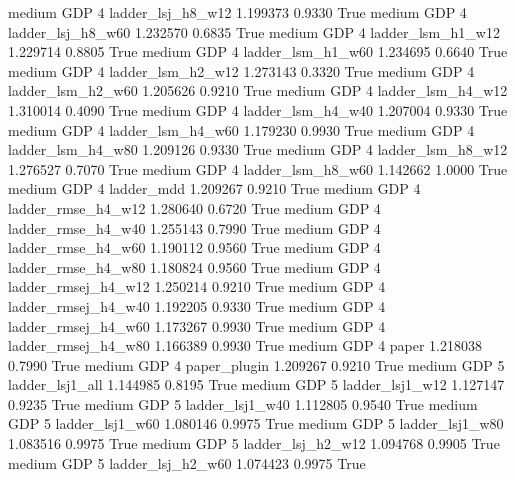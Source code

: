     medium      GDP                 4   ladder_lsj_h8_w12   1.199373      0.9330    True
    medium      GDP                 4   ladder_lsj_h8_w60   1.232570      0.6835    True
    medium      GDP                 4   ladder_lsm_h1_w12   1.229714      0.8805    True
    medium      GDP                 4   ladder_lsm_h1_w60   1.234695      0.6640    True
    medium      GDP                 4   ladder_lsm_h2_w12   1.273143      0.3320    True
    medium      GDP                 4   ladder_lsm_h2_w60   1.205626      0.9210    True
    medium      GDP                 4   ladder_lsm_h4_w12   1.310014      0.4090    True
    medium      GDP                 4   ladder_lsm_h4_w40   1.207004      0.9330    True
    medium      GDP                 4   ladder_lsm_h4_w60   1.179230      0.9930    True
    medium      GDP                 4   ladder_lsm_h4_w80   1.209126      0.9330    True
    medium      GDP                 4   ladder_lsm_h8_w12   1.276527      0.7070    True
    medium      GDP                 4   ladder_lsm_h8_w60   1.142662      1.0000    True
    medium      GDP                 4          ladder_mdd   1.209267      0.9210    True
    medium      GDP                 4  ladder_rmse_h4_w12   1.280640      0.6720    True
    medium      GDP                 4  ladder_rmse_h4_w40   1.255143      0.7990    True
    medium      GDP                 4  ladder_rmse_h4_w60   1.190112      0.9560    True
    medium      GDP                 4  ladder_rmse_h4_w80   1.180824      0.9560    True
    medium      GDP                 4 ladder_rmsej_h4_w12   1.250214      0.9210    True
    medium      GDP                 4 ladder_rmsej_h4_w40   1.192205      0.9330    True
    medium      GDP                 4 ladder_rmsej_h4_w60   1.173267      0.9930    True
    medium      GDP                 4 ladder_rmsej_h4_w80   1.166389      0.9930    True
    medium      GDP                 4               paper   1.218038      0.7990    True
    medium      GDP                 4        paper_plugin   1.209267      0.9210    True
    medium      GDP                 5     ladder_lsj1_all   1.144985      0.8195    True
    medium      GDP                 5     ladder_lsj1_w12   1.127147      0.9235    True
    medium      GDP                 5     ladder_lsj1_w40   1.112805      0.9540    True
    medium      GDP                 5     ladder_lsj1_w60   1.080146      0.9975    True
    medium      GDP                 5     ladder_lsj1_w80   1.083516      0.9975    True
    medium      GDP                 5   ladder_lsj_h2_w12   1.094768      0.9905    True
    medium      GDP                 5   ladder_lsj_h2_w60   1.074423      0.9975    True

